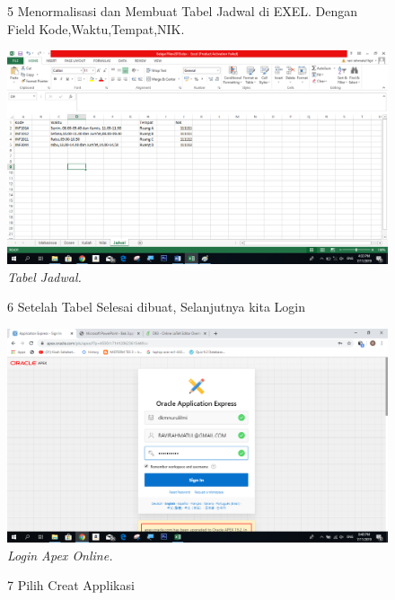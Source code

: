 \begin{enumerate}
\begin{figure}
\item[5]Menormalisasi dan Membuat Tabel Jadwal di EXEL. Dengan Field Kode,Waktu,Tempat,NIK.

    \begin{center}
    \includegraphics[scale=0.5]{figures/5.png}
    \caption{\textit{Tabel Jadwal.}}
    \end{center}
    \label{gambar}
    \end{figure}

\begin{figure}
\item[6] Setelah Tabel Selesai dibuat, Selanjutnya kita Login

    \begin{center}
    \includegraphics[scale=0.6]{figures/6.png}
    \caption{\textit{Login Apex Online.}}
     \end{center}
    \label{gambar}
    \end{figure}

\begin{figure}
\item[7]Pilih Creat Applikasi


\end{figure}
\end{enumerate}
